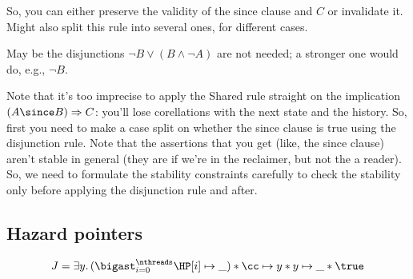 So, you can either preserve the validity of the since clause and $C$ or
invalidate it. Might also split this rule into several ones, for different cases.

May be the disjunctions $\neg B \vee (B \wedge \neg A)$ are not needed; a
stronger one would do, e.g., $\neg B$.

Note that it's too imprecise to apply the Shared rule straight on the
implication $(A \since B) \Rightarrow C$: you'll lose corellations with the next
state and the history. So, first you need to make a case split on whether the
since clause is true using the disjunction rule. Note that the assertions that
you get (like, the since clause) aren't stable in general (they are if we're in
the reclaimer, but not the a reader). So, we need to formulate the stability
constraints carefully to check the stability only before applying the
disjunction rule and after.

\subsection{Hazard pointers}


$$
J = \exists y.\, 
(\bigast_{i=0}^\nthreads \HP[i] \mapsto \_) * 
\cc \mapsto y * y \mapsto \_ * \true
$$

